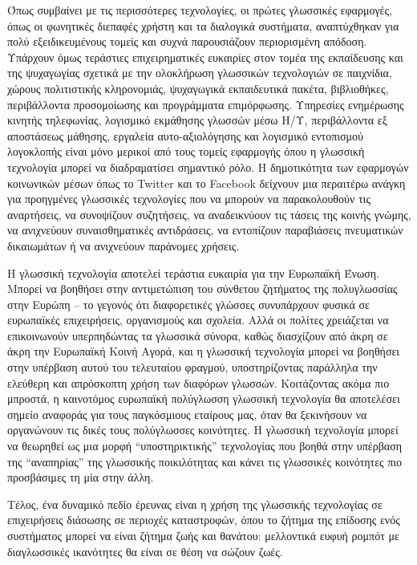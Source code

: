 \begin{multicols}{2}
Όπως συμβαίνει με τις περισσότερες τεχνολογίες, οι πρώτες γλωσσικές εφαρμογές, όπως οι φωνητικές διεπαφές χρήστη και τα διαλογικά συστήματα, αναπτύχθηκαν για πολύ εξειδικευμένους τομείς και συχνά παρουσιάζουν περιορισμένη απόδοση. Υπάρχουν όμως τεράστιες επιχειρηματικές ευκαιρίες στον τομέα της εκπαίδευσης και της ψυχαγωγίας σχετικά με την ολοκλήρωση γλωσσικών τεχνολογιών σε παιχνίδια, χώρους πολιτιστικής κληρονομιάς, ψυχαγωγικά εκπαιδευτικά πακέτα, βιβλιοθήκες, περιβάλλοντα προσομοίωσης και προγράμματα επιμόρφωσης. Υπηρεσίες ενημέρωσης κινητής τηλεφωνίας, λογισμικό εκμάθησης γλωσσών μέσω Η/Υ, περιβάλλοντα εξ αποστάσεως μάθησης, εργαλεία αυτο-αξιολόγησης και λογισμικό εντοπισμού λογοκλοπής είναι μόνο μερικοί από τους τομείς εφαρμογής όπου η γλωσσική τεχνολογία μπορεί να διαδραματίσει σημαντικό ρόλο. Η δημοτικότητα των εφαρμογών κοινωνικών μέσων όπως το Twitter και το Facebook δείχνουν μια περαιτέρω ανάγκη για προηγμένες γλωσσικές τεχνολογίες που να μπορούν να παρακολουθούν τις αναρτήσεις, να συνοψίζουν συζητήσεις, να αναδεικνύουν τις τάσεις της κοινής γνώμης, να ανιχνεύουν συναισθηματικές αντιδράσεις, να εντοπίζουν παραβιάσεις πνευματικών δικαιωμάτων ή να ανιχνεύουν παράνομες χρήσεις.


Η γλωσσική τεχνολογία αποτελεί τεράστια ευκαιρία για την Ευρωπαϊκή Ένωση. Μπορεί να βοηθήσει στην αντιμετώπιση του σύνθετου ζητήματος της πολυγλωσσίας στην Ευρώπη – το γεγονός ότι διαφορετικές γλώσσες συνυπάρχουν φυσικά σε ευρωπαϊκές επιχειρήσεις, οργανισμούς και σχολεία. Αλλά οι πολίτες χρειάζεται να επικοινωνούν υπερπηδώντας τα γλωσσικά σύνορα, καθώς διασχίζουν από άκρη σε άκρη την Ευρωπαϊκή Κοινή Αγορά, και η γλωσσική τεχνολογία μπορεί να βοηθήσει στην υπέρβαση αυτού του τελευταίου φραγμού, υποστηρίζοντας παράλληλα την ελεύθερη και απρόσκοπτη χρήση των διαφόρων γλωσσών. Κοιτάζοντας ακόμα πιο μπροστά, η καινοτόμος ευρωπαϊκή πολύγλωσση γλωσσική τεχνολογία θα αποτελέσει σημείο αναφοράς για τους παγκόσμιους εταίρους μας, όταν θα ξεκινήσουν να οργανώνουν τις δικές τους πολύγλωσσες κοινότητες. Η γλωσσική τεχνολογία μπορεί να θεωρηθεί ως μια μορφή “υποστηρικτικής” τεχνολογίας που βοηθά στην υπέρβαση της “αναπηρίας” της γλωσσικής ποικιλότητας και κάνει τις γλωσσικές κοινότητες πιο προσβάσιμες τη μία στην άλλη.

Τέλος, ένα δυναμικό πεδίο έρευνας είναι η χρήση της γλωσσικής τεχνολογίας σε επιχειρήσεις διάσωσης σε περιοχές καταστροφών, όπου το ζήτημα της επίδοσης ενός συστήματος μπορεί να είναι ζήτημα ζωής και θανάτου: μελλοντικά ευφυή ρομπότ με διαγλωσσικές ικανότητες θα είναι σε θέση να σώζουν ζωές.


\end{multicols}
